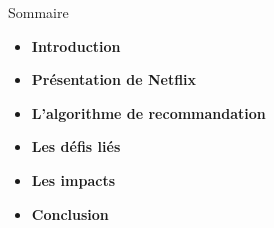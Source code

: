 \begin{frame}{Sommaire}
    \begin{itemize}
        \item \textbf{Introduction}
        \item \textbf{Présentation de Netflix}
        \item \textbf{L'algorithme de recommandation}
        \item \textbf{Les défis liés}
        \item \textbf{Les impacts}
        \item \textbf{Conclusion}
    \end{itemize}
\end{frame}